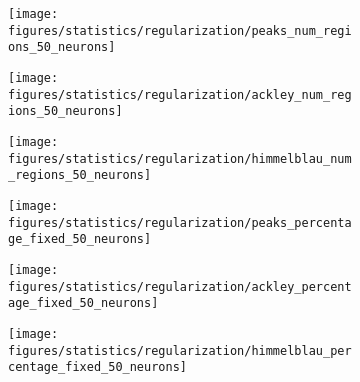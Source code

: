 \begin{figure}[H]
    \begin{subfigure}{.32\linewidth}
        \centering
        \texttt{[image: figures/statistics/regularization/peaks\_num\_regions\_50\_neurons]}
    \end{subfigure}
    \begin{subfigure}{.32\linewidth}
        \centering
        \texttt{[image: figures/statistics/regularization/ackley\_num\_regions\_50\_neurons]}
    \end{subfigure}
    \begin{subfigure}{.32\linewidth}
        \centering
        \texttt{[image: figures/statistics/regularization/himmelblau\_num\_regions\_50\_neurons]}
    \end{subfigure}

    \begin{subfigure}{.32\linewidth}
        \texttt{[image: figures/statistics/regularization/peaks\_percentage\_fixed\_50\_neurons]}
    \end{subfigure}
    \begin{subfigure}{.32\linewidth}
        \texttt{[image: figures/statistics/regularization/ackley\_percentage\_fixed\_50\_neurons]}
    \end{subfigure}
    \begin{subfigure}{.32\linewidth}
        \texttt{[image: figures/statistics/regularization/himmelblau\_percentage\_fixed\_50\_neurons]}
    \end{subfigure}



\end{figure}
